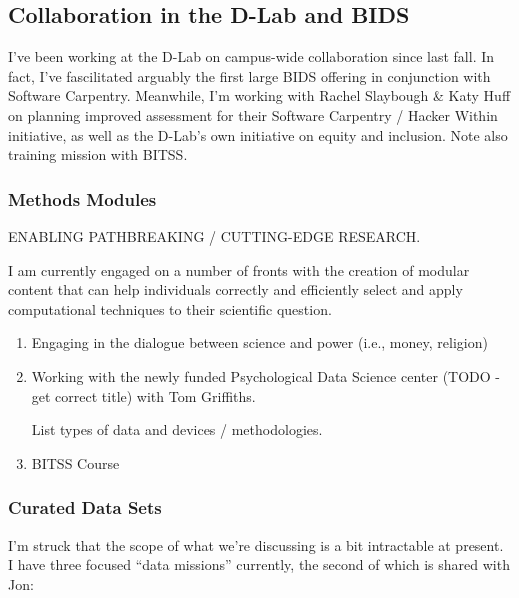 \subsection*{Collaboration in the D-Lab and BIDS}

I've been working at the D-Lab on campus-wide collaboration since last fall. In
fact, I've fascilitated arguably the first large BIDS offering in conjunction with Software Carpentry.
Meanwhile, I'm working with Rachel Slaybough \& Katy Huff on planning improved
assessment for their Software Carpentry / Hacker Within initiative, as well as
the D-Lab's own initiative on equity and inclusion. Note also training mission
with BITSS.

\subsubsection*{Methods Modules}

ENABLING PATHBREAKING / CUTTING-EDGE RESEARCH.

I am currently engaged on a number of fronts with the creation of modular
content that can help individuals correctly and efficiently select and apply
computational techniques to their scientific question.

\begin{enumerate}
    \item Engaging in the dialogue between science and power (i.e., money,
        religion)

    \item Working with the newly funded Psychological Data Science center (TODO
        - get correct title) with Tom Griffiths.

        List types of data and devices / methodologies.

    \item BITSS Course

\end{enumerate}

\subsubsection*{Curated Data Sets}

I'm struck that the scope of what we're discussing is a bit intractable at
present. I have three focused “data missions” currently, the second of which is
shared with Jon:

